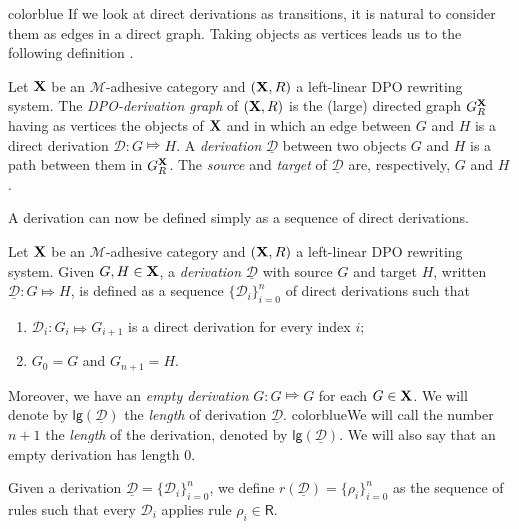 \documentclass[a4paper,UKenglish,cleveref,pdftex,thm-restate,numberwithinsect,anonymous]{lipics}
\newcommand{\full}[1]{{color{blue}#1}}
\newcommand{\full}[1]{}
\def\R{\mathsf{R}}
\def\X{\textbf {\textup{X}}}
\newcommand{\dder}[1]{\mathscr{#1}}
\newcommand{\der}[1]{\underline{\dder{#1}}}
\def\gpo{\mathsf{G}^{\X}_R}
\newcommand{\lgh}[0]{\mathsf{lg}}
\begin{document}
\full{
  If we look at direct derivations as
  transitions, it is natural to consider them as edges in a direct
  graph. Taking objects as vertices leads us to the following
  definition \cite{heindel2009category}.

  \begin{definition}
    Let  $\X$ be an $\mathcal{M}$-adhesive category and 
    $(\X, \R)$ a left-linear DPO rewriting system. 
    The \emph{DPO-derivation graph} of
    $(\X, \R)$ is the (large) directed graph $\gpo$ having as vertices
    the objects of $\X$ and in which an edge between $G$ and $H$ is a
    direct derivation $\dder{D}\colon G\Mapsto H$. A \emph{derivation}
    $\der{D}$ between two objects $G$ and $H$ is a path between them
    in $\gpo$. The \emph{source} and \emph{target} of $\der{D}$ are,
    respectively, $G$ and $H$.
  \end{definition}
}

A derivation can now be defined simply as a sequence of direct derivations.

\begin{definition}[Derivation]
  Let  $\X$ be an $\mathcal{M}$-adhesive category and 
  $(\X, \R)$ a left-linear DPO rewriting system. 
  Given $G, H \in \X$, a \emph{derivation}
  $\der{D}$ with source $G$ and target $H$, written
  $\der{D}: G \Mapsto H$, is defined as a sequence
  $\{\dder{D}_i\}_{i=0}^n$ of direct derivations such that
  \begin{enumerate}
  \item $\dder{D}_i : G_i \Mapsto G_{i+1}$ is a direct derivation for
    every index $i$;
  \item $G_0=G$ and $G_{n+1}=H$.
  \end{enumerate}
  Moreover, we have an \emph{empty derivation} $G : G \Mapsto G$ for each $G \in \X$.
  We will denote by $\lgh(\der{D})$ the \emph{length} of derivation $\der{D}$.
  \full{We will call the number $n+1$ the \emph{length} of the derivation,
  denoted by $\lgh(\der{D})$. We will also say that an empty
  derivation has length $0$.}

 Given a derivation $\der{D}=\{\dder{D}_i\}_{i=0}^n$, we define $r(\der{D})  = \{\rho_i\}_{i=0}^n$ as the sequence of 
 rules such that every $\dder{D}_i$ applies rule $\rho_i\in \R$.  
\end{definition}
\end{document}
